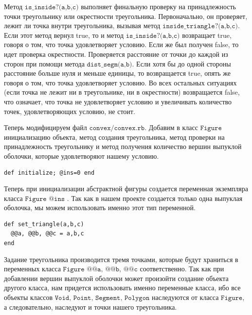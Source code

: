 Метод $\texttt{is\_inside?(a,b,c)}$ выполняет финальную проверку на принадлежность точки треугольнику или окрестности треугольника. Первоначально, он проверяет, лежит ли точка внутри треугольника, вызывая метод $\texttt{inside\_triangle?(a,b,c)}$. Если этот метод вернул true, то и метод $\texttt{is\_inside?(a,b,c)}$ возвращает true, говоря о том, что точка удовлетворяет условию. Если же был получен false, то идет проверка окрестности. Проверяется расстояние от точки до каждой из сторон при помощи метода $\texttt{dist\_segm(a,b)}$. Если хотя бы до одной стороны расстояние больше нуля и меньше единицы, то возвращается true, опять же говоря о том, что точка удовлетворяет условию. Во всех остальных ситуациях (если точка не лежит ни в треугольнике, ни в окрестности) возвращается false, что означает, что точка не удовлетворяет условию и увеличивать количество точек, удовлетворяющих условию, не стоит.

Теперь модифицируем файл $\texttt{convex/convex.rb}$. Добавим в класс $\texttt{Figure}$  инициализацию объекта, метод создания треугольника, метод проверки
на принадлежность треугольнику и метод получения количество вершин выпуклой оболочки, которые удовлетворяют нашему условию.

\begin{small}
\begin{verbatim}
def initialize; @ins=0 end
\end{verbatim}
\end{small}

Теперь при инициализации абстрактной фигуры создается переменная экземпляра класса  $\texttt{Figure @ins}$ . Так как в нашем проекте создается только одна выпуклая
оболочка, мы можем использовать именно этот тип переменной.

\begin{small}
\begin{verbatim}
def set_triangle(a,b,c)
  @@a, @@b, @@c = a,b,c
end
\end{verbatim}
\end{small}

Задание треугольника производится тремя точками, которые будут храниться в переменных класса  $\texttt{Figure @@a, @@b, @@c}$ соответственно. Так как при добавлении вершин выпуклой оболочки может произойти создание объекта другого класса, нам придется использовать именно переменные класса, ибо все объекты классов 
$\texttt{Void, Point, Segment, Polygon}$ наследуются от класса $\texttt{Figure}$, а следовательно, наследуют и точки нашего треугольника.

